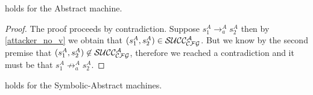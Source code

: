 \begin{lemma}
  \label{av_no_attacker_A}
   holds for the Abstract machine.
\end{lemma}
\begin{proof}
  The proof proceeds by contradiction.
  Suppose $s^A_1 \to^A_a s^A_2$ then by \cref{attacker_no_v}
  we obtain that $(s^A_1,s^A_2) \in \mathcal{SUCC_\mathcal{CFG}^{A}}$. But we know
  by the second premise that $(s^A_1,s^A_2) \not \in \mathcal{SUCC_\mathcal{CFG}^{A}}$,
  therefore we reached a contradiction and it must be that
  $s^A_1 \not \to^A_a s^A_2$.
\end{proof}

\begin{lemma}
  \label{as_implies_ss}
   holds for the Symbolic-Abstract machines.
\end{lemma}
